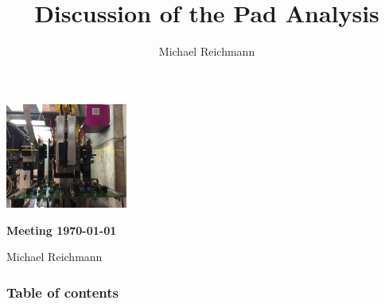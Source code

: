 \documentclass[9pt]{beamer}
\title[Analysis]{Discussion of the Pad Analysis}
\author[M. Reichmann]{Michael Reichmann}
\institute[\textbf{\textit{ETH}}\scalebox{.6}{\textit{Z\"{u}rich}}]{Swiss Federal Institute of Technology Zurich}
\begin{document}
\begin{frame}
	\begin{center}
		\includegraphics[width=4cm]{telescope3}
	\end{center}
	\begin{alertblock}{
		\begin{center}
			\textbf{Meeting \today}
		\end{center}}
		\vspace*{10pt}
		\begin{center}\small
		Michael Reichmann
		\end{center}\normalsize
	\end{alertblock}
\end{frame}
\begin{frame}[allowframebreaks]
	\frametitle{Table of contents}
	\tableofcontents[pausesections]
\end{frame}
\end{document}
